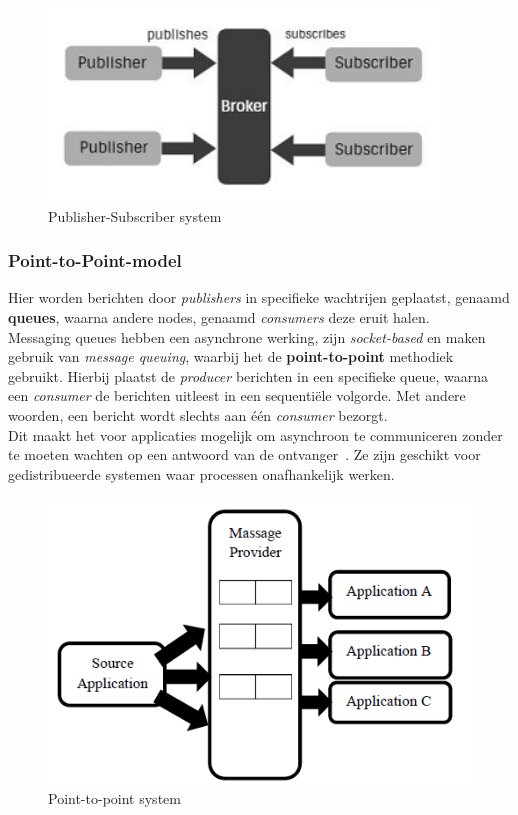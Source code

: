 \begin{figure}[h!]
  \centering
  \includegraphics[width=.4\textwidth]{../voorstel/img/fig1-publish-subscribe.png}
  \caption{\label{fig:pub-sub}Publisher-Subscriber system~\autocite{Sharvari2019}}
\end{figure}

\subsubsection{Point-to-Point-model}
Hier worden berichten door \emph{publishers} in specifieke wachtrijen geplaatst, 
genaamd \textbf{queues}, waarna andere nodes, genaamd \emph{consumers} deze eruit halen. 
\\
Messaging queues hebben een asynchrone werking, zijn \emph{socket-based} en maken gebruik van \emph{message queuing}, 
waarbij het de \textbf{point-to-point} methodiek gebruikt.
Hierbij plaatst de \emph{producer} berichten in een specifieke queue, waarna een \emph{consumer} de berichten uitleest in een sequentiële volgorde.
Met andere woorden, een bericht wordt slechts aan één \emph{consumer} bezorgt.
\\
Dit maakt het voor applicaties mogelijk om asynchroon te communiceren zonder te moeten wachten op een antwoord van de ontvanger~\autocite{Dinari2020}.
Ze zijn geschikt voor gedistribueerde systemen waar processen onafhankelijk werken.

\begin{figure}[h!]
  \centering
  \includegraphics[width=.4\textwidth]{../bachproef/img/point-to-point-messaging.png}
  \caption{\label{fig:point-to-point}Point-to-point system~\autocite{Dinari2020}}
\end{figure}


